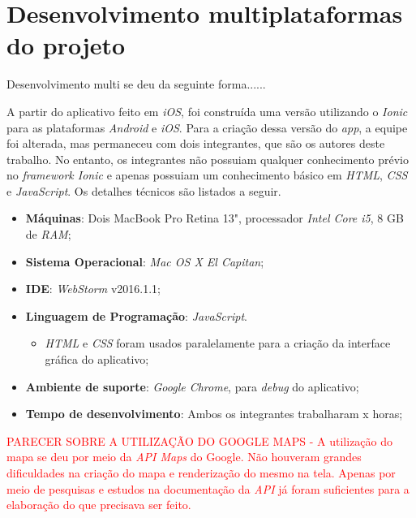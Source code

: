 \section{Desenvolvimento multiplataformas do projeto} \label{sec:desenvolvimentomulti}

Desenvolvimento multi se deu da seguinte forma......

A partir do aplicativo feito em \textit{iOS}, foi construída uma versão utilizando o \textit{Ionic} para as plataformas \textit{Android} e \textit{iOS}.
Para a criação dessa versão do \textit{app}, a equipe foi alterada, mas permaneceu com dois integrantes, que são os autores deste trabalho.
No entanto, os integrantes não possuiam qualquer conhecimento prévio no \textit{framework Ionic}
e apenas possuiam um conhecimento básico em \textit{HTML}, \textit{CSS} e \textit{JavaScript}. Os detalhes técnicos são listados a seguir.
   
\begin{itemize}
    \item \textbf{Máquinas}: Dois MacBook Pro Retina 13", processador \textit{Intel Core i5}, 8 GB de \textit{RAM};
    \item \textbf{Sistema Operacional}: \textit{Mac OS X El Capitan};
    \item \textbf{IDE}: \textit{WebStorm} v2016.1.1;
    \item \textbf{Linguagem de Programação}: \textit{JavaScript}. 
    \begin{itemize}
        \item \textit{HTML} e \textit{CSS} foram usados paralelamente para a criação da interface gráfica do aplicativo;
    \end{itemize}
    \item \textbf{Ambiente de suporte}: \textit{Google Chrome}, para \textit{debug} do aplicativo;
    \item \textbf{Tempo de desenvolvimento}: Ambos os integrantes trabalharam x horas;
\end{itemize}

\begin{comment}
será que aqui fala das versoes do ios, ionic, cordova, angularjs? sim e explicar pq nao escolheu a versao 2 do ionic, pq eh recente e estavel
\end{comment}

\textcolor{red}{PARECER SOBRE A UTILIZAÇÃO DO GOOGLE MAPS - A utilização do mapa se deu por meio da \textit{API Maps} do Google. Não houveram grandes dificuldades na criação do mapa e renderização do mesmo na tela. Apenas por meio de pesquisas e estudos na documentação
da \textit{API} já foram suficientes para a elaboração do que precisava ser feito. }